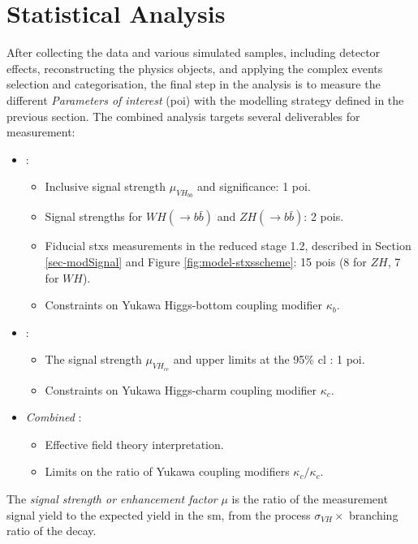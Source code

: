 
\section{Statistical Analysis}\label{sec-fitFramework}
After collecting the data and various simulated samples, including detector effects, reconstructing the physics objects, and applying the complex events selection and categorisation, the final step in the analysis is to measure the different \textit{Parameters of interest} (\gls{poi}) with the modelling strategy defined in the previous section. The combined analysis targets several deliverables for measurement:
\begin{itemize}[leftmargin=*]
\item \textit{\vhb}: 
    \begin{itemize}
        \item Inclusive signal strength $\mu_{VH_{bb}}$ and significance: 1 \gls{poi}.
        \item Signal strengths for $WH(\rightarrow b\bar{b})$ and $ZH(\rightarrow b\bar{b})$: 2 \gls{poi}s.
        \item Fiducial \gls{stxs} measurements in the reduced stage 1.2, described in Section \ref{sec-modSignal} and Figure \ref{fig:model-stxsscheme}: 15 \gls{poi}s (8 for $ZH$, 7 for $WH$).
        \item Constraints on Yukawa Higgs-bottom coupling modifier $\kappa_b$. %
    \end{itemize}
\item \textit{\vhc}:
    \begin{itemize}
        \item The signal strength $\mu_{VH_{cc}}$ and upper limits at the 95\% \gls{cl} : 1 \gls{poi}.
        \item Constraints on Yukawa Higgs-charm coupling modifier $\kappa_c$. %
    \end{itemize}
\item \textit{Combined \vhbc}: 
    \begin{itemize}
        \item Effective field theory interpretation.
        \item Limits on the ratio of Yukawa coupling modifiers $\kappa_c / \kappa_c$. %
    \end{itemize}
\end{itemize}

The \textit{signal strength or enhancement factor} $\mu$ is the ratio of the measurement signal yield to the expected yield in the \gls{sm}, from the process $\sigma_{VH} \times$ branching ratio of the decay.

